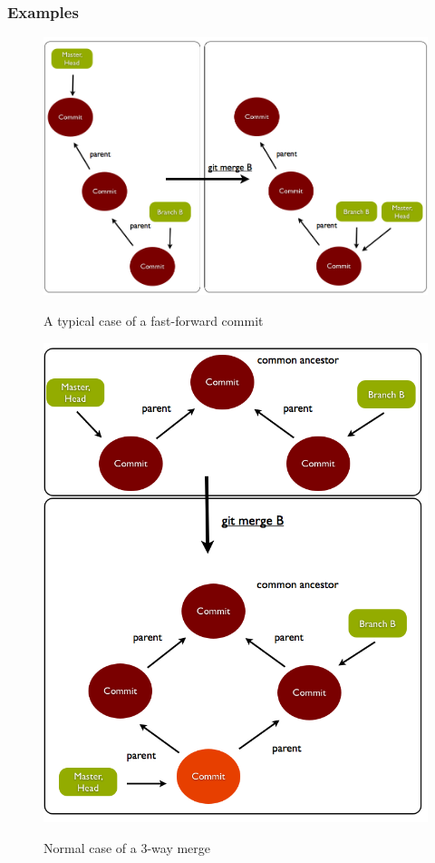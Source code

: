 \subsubsection{Examples}
\begin{figure} 
	\caption{A typical case of a fast-forward commit}
	\centering
	\includegraphics[scale=0.45]{images/fastforward.png}
	\label{fig:fastforward}
\end{figure}
\begin{figure} 
	\caption{Normal case of a 3-way merge}
	\centering
	\includegraphics[scale=0.45]{images/normalmerge.png}
	\label{fig:merge}
\end{figure}
